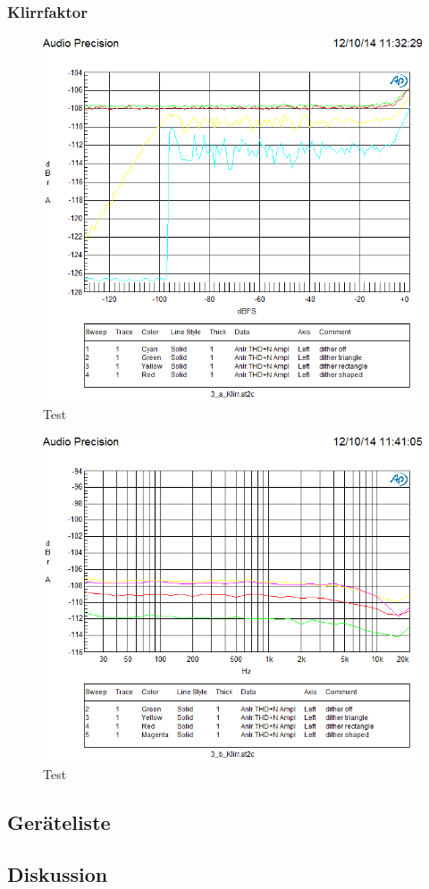 
\subsubsection{Klirrfaktor}


\begin{figure}
\centering
\includegraphics[width=\columnwidth]{figures/Aufg2/3a5.PNG} 
\caption{Test}
\end{figure}

\begin{figure}
\centering
\includegraphics[width=\columnwidth]{figures/Aufg2/3b1.PNG} 
\caption{Test}
\end{figure}



\subsection{Geräteliste}

\subsection{Diskussion}

